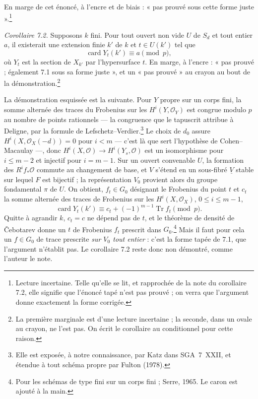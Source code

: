 \documentclass[11pt,a4paper]{article}
\begin{document}
En marge de cet énoncé, à l'encre et de biais : « pas prouvé sous cette forme
juste ».\footnote{Lecture incertaine. Telle qu'elle se lit, et rapprochée de la
note du corollaire 7.2, elle signifie que l'énoncé tapé n'est pas prouvé ; on
verra que l'argument donne exactement la forme corrigée.}

\emph{Corollaire 7.2.} Supposons $k$ fini. Pour tout ouvert non vide $U$ de
$S_d$ et tout entier $a$, il existerait une extension finie $k'$ de $k$ et
$t \in U(k')$ tel que
\[ \operatorname{card} Y_t(k') \equiv a \pmod p , \]
où $Y_t$ est la section de $X_{k'}$ par l'hypersurface $t$. En marge, à l'encre :
« pas prouvé ; également 7.1 sous sa forme juste », et un « pas prouvé » au crayon
au bout de la démonstration.\footnote{La première marginale est d'une lecture
incertaine ; la seconde, dans un ovale au crayon, ne l'est pas. On écrit le
corollaire au conditionnel pour cette raison.}

La démonstration esquissée est la suivante. Pour $Y$ propre sur un corps fini, la
somme alternée des traces du Frobenius sur les $H^i(Y, \mathcal{O}_Y)$ est
congrue modulo $p$ au nombre de points rationnels --- la congruence que le
tapuscrit attribue à Deligne, par la formule de Lefschetz--Verdier.\footnote{Elle
est exposée, à notre connaissance, par Katz dans SGA~7~XXII, et étendue à tout
schéma propre par Fulton (1978).} Le choix de $d_0$ assure
$H^i(X, \mathcal{O}_X(-d)) = 0$ pour $i < m$ --- c'est là que sert l'hypothèse de
Cohen--Macaulay ---, donc $H^i(X, \mathcal{O}) \to H^i(Y_s, \mathcal{O})$ est un
isomorphisme pour $i \leqslant m-2$ et injectif pour $i = m-1$. Sur un ouvert
convenable $U$, la formation des $R^if_*\mathcal{O}$ commute au changement de
base, et $V$ s'étend en un sous-fibré $\underline{V}$ stable sur lequel $F$ est
bijectif ; la représentation $V_0$ provient alors du groupe fondamental $\pi$ de
$U$. On obtient, $f_t \in G_0$ désignant le Frobenius du point $t$ et $c_t$ la
somme alternée des traces de Frobenius sur les $H^i(X, \mathcal{O}_X)$,
$0 \leqslant i \leqslant m-1$,
\[ \operatorname{card} Y_t(k') \equiv c_t + (-1)^{m-1}\operatorname{Tr} f_t
\pmod p . \]
Quitte à agrandir $k$, $c_t = c$ ne dépend pas de $t$, et le théorème de densité
de Čebotarev donne un $t$ de Frobenius $f_t$ prescrit dans $G_0$.\footnote{Pour
les schémas de type fini sur un corps fini ; Serre, 1965. Le caron est ajouté à la
main.} Mais il faut pour cela un $f \in G_0$ de trace prescrite \emph{sur $V_0$
tout entier} : c'est la forme tapée de 7.1, que l'argument n'établit pas. Le
corollaire 7.2 reste donc non démontré, comme l'auteur le note.
\end{document}
